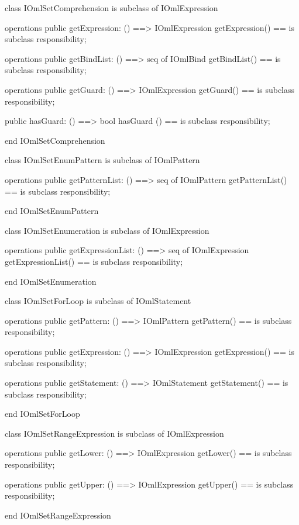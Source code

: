 \begin{vdm_al}
class IOmlSetComprehension
 is subclass of IOmlExpression

operations
  public getExpression: () ==> IOmlExpression
  getExpression() == is subclass responsibility;

operations
  public getBindList: () ==> seq of IOmlBind
  getBindList() == is subclass responsibility;

operations
  public getGuard: () ==> IOmlExpression
  getGuard() == is subclass responsibility;

  public hasGuard: () ==> bool
  hasGuard () == is subclass responsibility;

end IOmlSetComprehension
\end{vdm_al}

\begin{vdm_al}
class IOmlSetEnumPattern
 is subclass of IOmlPattern

operations
  public getPatternList: () ==> seq of IOmlPattern
  getPatternList() == is subclass responsibility;

end IOmlSetEnumPattern
\end{vdm_al}

\begin{vdm_al}
class IOmlSetEnumeration
 is subclass of IOmlExpression

operations
  public getExpressionList: () ==> seq of IOmlExpression
  getExpressionList() == is subclass responsibility;

end IOmlSetEnumeration
\end{vdm_al}

\begin{vdm_al}
class IOmlSetForLoop
 is subclass of IOmlStatement

operations
  public getPattern: () ==> IOmlPattern
  getPattern() == is subclass responsibility;

operations
  public getExpression: () ==> IOmlExpression
  getExpression() == is subclass responsibility;

operations
  public getStatement: () ==> IOmlStatement
  getStatement() == is subclass responsibility;

end IOmlSetForLoop
\end{vdm_al}

\begin{vdm_al}
class IOmlSetRangeExpression
 is subclass of IOmlExpression

operations
  public getLower: () ==> IOmlExpression
  getLower() == is subclass responsibility;

operations
  public getUpper: () ==> IOmlExpression
  getUpper() == is subclass responsibility;

end IOmlSetRangeExpression
\end{vdm_al}

